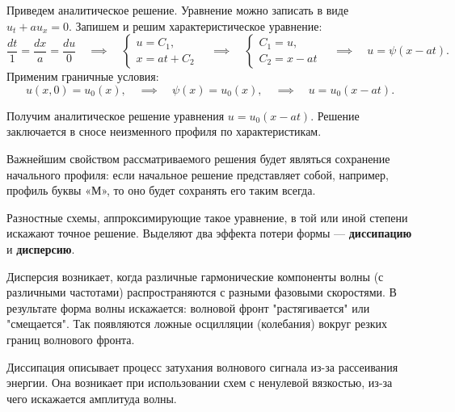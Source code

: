 \documentclass[12pt, a4paper]{article}
\begin{document}
Приведем аналитическое решение. Уравнение можно записать в виде $ u_t + a u_x = 0 $.
Запишем и решим характеристическое уравнение:
\begin{equation*}
	\dfrac{dt}{1} = \dfrac{dx}{a} = \dfrac{du}{0} \quad \implies  \quad 
	\begin{cases}
		u = C_1,\\
		x = a t + C_2
	\end{cases} 
	\quad \implies \quad
	\begin{cases}
		C_1 = u,\\
		C_2 = x - at
	\end{cases}
	\quad \implies \quad
	u = \psi(x-a t).
\end{equation*}
\newpage
Применим граничные условия:
\vspace{-1em}
\begin{equation*}
	u(x, 0) = u_0(x),
	\quad \implies \quad
	\psi(x) = u_0(x),
	\quad \implies \quad
	u = u_0(x-a t).
\end{equation*}

Получим аналитическое решение уравнения $u = u_0(x-at)$. Решение заключается в сносе неизменного профиля по характеристикам. 

Важнейшим свойством рассматриваемого решения будет являться сохранение начального профиля: если начальное решение представляет собой, например, профиль буквы «М», то оно будет сохранять его таким всегда. 

Разностные схемы, аппроксимирующие такое уравнение, в той или иной степени искажают точное решение. Выделяют два эффекта потери формы --- \textbf{диссипацию} и \textbf{дисперсию}.

Дисперсия возникает, когда различные гармонические компоненты волны (с различными частотами) распространяются с разными фазовыми скоростями. В результате форма волны искажается: волновой фронт "растягивается" или "смещается". Так появляются ложные осцилляции (колебания) вокруг резких границ волнового фронта. \cite[c.283]{1}

Диссипация описывает процесс затухания волнового сигнала из-за рассеивания энергии. Она возникает при использовании схем с ненулевой вязкостью, из-за чего искажается амплитуда волны.  
\end{document}
